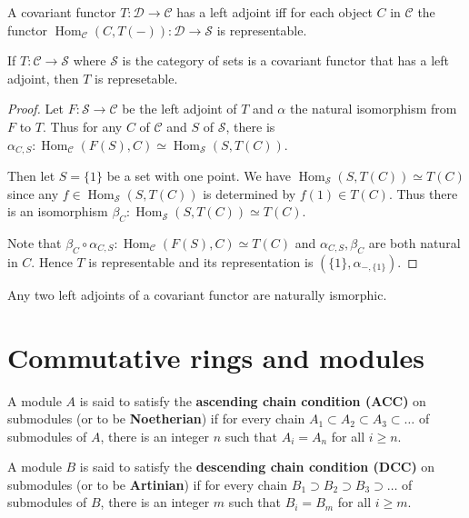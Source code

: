 \documentclass{article}
\DeclareMathOperator{\Hom}{Hom}
\begin{document}
\begin{proposition}
    A covariant functor $T : \mathscr{D} \to \mathscr{C}$ has a left adjoint iff for each object $C$ in $\mathscr{C}$ the functor $\Hom_{\mathscr{C}}(C, T(-)) : \mathscr{D} \to \mathscr{S}$ is representable.
\end{proposition}

\begin{theorem}
    If $T:\mathscr{C}\to \mathscr{S}$ where $\mathscr{S}$ is the category of sets is a covariant functor that has a left adjoint, then $T$ is represetable.
\end{theorem}
\begin{proof}
    Let $F:\mathscr{S}\to \mathscr{C}$ be the left adjoint of $T$ and $\alpha$ the natural isomorphism from $F$ to $T$. Thus for any $C$ of $\mathscr{C}$ and $S$ of $\mathscr{S}$, there is $\alpha_{C,S}:\Hom_{\mathscr{C}}(F(S),C) \simeq \Hom_{\mathscr{S}}(S,T(C))$. 

    Then let $S=\{1\}$ be a set with one point. We have $\Hom_{\mathscr{S}}(S,T(C)) \simeq T(C)$ since any $f \in \Hom_{\mathscr{S}}(S,T(C))$ is determined by $f(1) \in T(C)$. Thus there is an isomorphism $\beta_C:\Hom_{\mathscr{S}}(S,T(C)) \simeq T(C)$.

    Note that $\beta_C \circ \alpha_{C,S}:\Hom_{\mathscr{C}}(F(S),C) \simeq T(C)$ and $\alpha_{C,S}, \beta_C$ are both natural in $C$. Hence $T$ is representable and its representation is $(\{1\},\alpha_{-,\{1\}})$. 
\end{proof}

\begin{corollary}
    Any two left adjoints of a covariant functor are naturally ismorphic.
\end{corollary}



\newpage
\section{Commutative rings and modules}
\begin{definition}
    A module $A$ is said to satisfy the \textbf{ascending chain condition (ACC)} on submodules (or to be \textbf{Noetherian}) if for every chain $A_1 \subset A_2 \subset A_3 \subset \dots$ of submodules of $A$, there is an integer $n$ such that $A_i = A_n$ for all $i \ge n$.

    A module $B$ is said to satisfy the \textbf{descending chain condition (DCC)} on submodules (or to be \textbf{Artinian}) if for every chain $B_1 \supset B_2 \supset B_3 \supset \dots$ of submodules of $B$, there is an integer $m$ such that $B_i = B_m$ for all $i \ge m$.
\end{definition}
\end{document}
